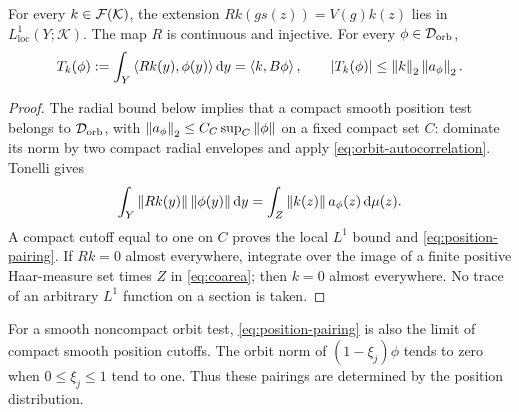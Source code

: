 \begin{lemma}
For every $k\in\mathcal F(\mathcal K)$, the extension
$Rk(gs(z))=V(g)k(z)$ lies in $L^1_{\mathrm{loc}}(Y;\mathcal K)$.
The map $R$ is continuous and injective. For every $\phi\in\mathcal D_{\mathrm{orb}}$,
\begin{equation}
 T_k(\phi):=\int_Y\left\langle Rk(y),\phi(y)\right\rangle\mathop{}\!\mathrm d y
 =\left\langle k,B\phi\right\rangle,\qquad |T_k(\phi)|\le\left\lVert k\right\rVert_2\left\lVert a_\phi\right\rVert_2.
 \label{eq:position-pairing}
\end{equation}
\label{lem:position-distribution}
\end{lemma}
\begin{proof}
The radial bound below implies that a compact smooth position test belongs
to $\mathcal D_{\mathrm{orb}}$, with $\left\lVert a_\phi\right\rVert_2\le C_C\sup_C\left\lVert\phi\right\rVert$
on a fixed compact set $C$: dominate its norm by two compact radial
envelopes and apply \eqref{eq:orbit-autocorrelation}.
Tonelli gives
\begin{equation}
 \int_Y\left\lVert Rk(y)\right\rVert\left\lVert\phi(y)\right\rVert\mathop{}\!\mathrm d y
 =\int_Z\left\lVert k(z)\right\rVert a_\phi(z)\mathop{}\!\mathrm d\mu(z).
\end{equation}
A compact cutoff equal to one on $C$ proves the local $L^1$ bound and
\eqref{eq:position-pairing}. If $Rk=0$ almost everywhere, integrate over
the image of a finite positive Haar-measure set times $Z$ in
\eqref{eq:coarea}; then $k=0$ almost everywhere. No trace of an arbitrary
$L^1$ function on a section is taken.
\end{proof}

For a smooth noncompact orbit test, \eqref{eq:position-pairing} is also the
limit of compact smooth position cutoffs. The orbit norm of
$(1-\xi_j)\phi$ tends to zero when $0\le\xi_j\le1$ tend to one.
Thus these pairings are determined by the position distribution.